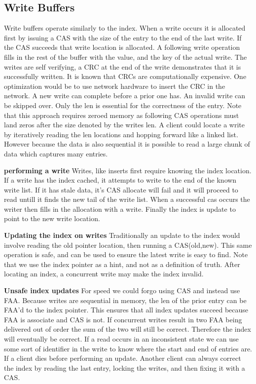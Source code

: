 \subsection{Write Buffers} Write buffers operate similarly to the index. When a
write occurs it is allocated first by issuing a CAS with the size of the entry
to the end of the last write. If the CAS succeeds that write location is
allocated. A following write operation fills in the rest of the buffer with the
value, and the key of the actual write. The writes are self verifying, a CRC at
the end of the write demonstrates that it is successfully written. It is known
that CRCs are computationally expensive. One optimization would be to use
network hardware to insert the CRC in the network. A new write can complete
before a prior one has. An invalid write can be skipped over. Only the len is
essential for the correctness of the entry. Note that this approach requires
zeroed memory as following CAS operations must land zeros after the size denoted
by the writes len. A client could locate a write by iteratively reading the len
locations and hopping forward like a linked list. However because the data is
also sequential it is possible to read a large chunk of data which captures many
entries.

\textbf{performing a write} Writes, like inserts first require knowing the index
location. If a write has the index cached, it attempts to write to the end of
the known write list. If it has stale data, it's CAS allocate will fail and it
will proceed to read untill it finds the new tail of the write list. When a
successful cas occurs the writer then fills in the allocation with a write.
Finally the index is update to point to the new write location.

\textbf{Updating the index on writes} Traditionally an update to the index would
involve reading the old pointer location, then running a CAS(old,new). This same
operation is safe, and can be used to ensure the latest write is easy to find.
Note that we use the index pointer as a hint, and not as a definition of truth.
After locating an index, a concurrent write may make the index invalid.

\textbf{Unsafe index updates} For speed we could forgo using CAS and instead use
FAA. Because writes are sequential in memory, the len of the prior entry can be
FAA'd to the index pointer. This ensures that all index updates succeed because
FAA is associate and CAS is not. If concurrent writes result in two FAA being
delivered out of order the sum of the two will still be correct. Therefore the
index will eventually be correct. If a read occurs in an inconsistent state we
can use some sort of identifier in the write to know where the start and end of
entries are. If a client dies before performing an update. Another client can
always correct the index by reading the last entry, locking the writes, and then
fixing it with a CAS.